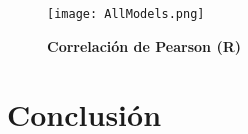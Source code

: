 \documentclass[11pt,letterpaper]{article}
\numberwithin{equation}{subsection}
\numberwithin{table}{subsection}
\begin{document}
\begin{figure}[H]
\centering
	\texttt{[image: AllModels.png]}
	\captionsetup{labelfont=bf}
	\caption{\scriptsize \textbf {Correlación de Pearson (R)} }
	\label{fig:Fig26}
\end{figure} 



\section{Conclusión}

 
%


%
%
%	
%
\end{document}
